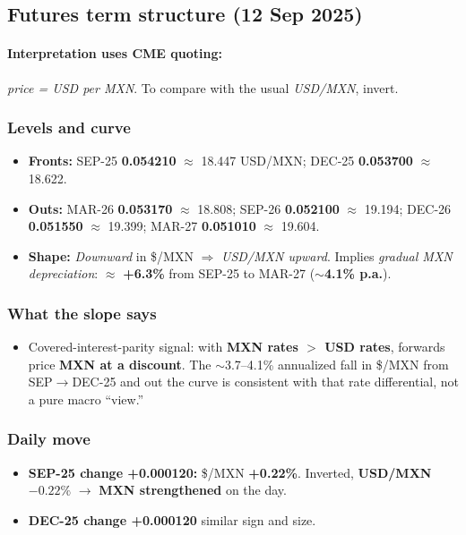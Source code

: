 \documentclass[11pt,a4paper]{article} %
\begin{document}
\subsection{Futures term structure (12 Sep 2025)}
\paragraph{Interpretation uses CME quoting:} \emph{price = USD per MXN}. To compare with the usual \emph{USD/MXN}, invert.

\subsubsection*{Levels and curve}
\begin{itemize}
  \item \textbf{Fronts:} SEP-25 \textbf{0.054210} $\approx$ 18.447 USD/MXN; DEC-25 \textbf{0.053700} $\approx$ 18.622.
  \item \textbf{Outs:} MAR-26 \textbf{0.053170} $\approx$ 18.808; SEP-26 \textbf{0.052100} $\approx$ 19.194; DEC-26 \textbf{0.051550} $\approx$ 19.399; MAR-27 \textbf{0.051010} $\approx$ 19.604.
  \item \textbf{Shape:} \emph{Downward} in \$/MXN $\Rightarrow$ \emph{USD/MXN upward}. Implies \emph{gradual MXN depreciation}: $\approx$ \textbf{+6.3\%} from SEP-25 to MAR-27 ($\sim$\textbf{4.1\% p.a.}).
\end{itemize}

\subsubsection*{What the slope says}
\begin{itemize}
  \item Covered-interest-parity signal: with \textbf{MXN rates $>$ USD rates}, forwards price \textbf{MXN at a discount}. The $\sim$3.7--4.1\% annualized fall in \$/MXN from SEP$\rightarrow$DEC-25 and out the curve is consistent with that rate differential, not a pure macro ``view.''
\end{itemize}

\subsubsection*{Daily move}
\begin{itemize}
  \item \textbf{SEP-25 change +0.000120:} \$/MXN \textbf{+0.22\%}. Inverted, \textbf{USD/MXN $-0.22\%$} $\rightarrow$ \textbf{MXN strengthened} on the day.
  \item \textbf{DEC-25 change +0.000120} similar sign and size.
\end{itemize}
\end{document}
